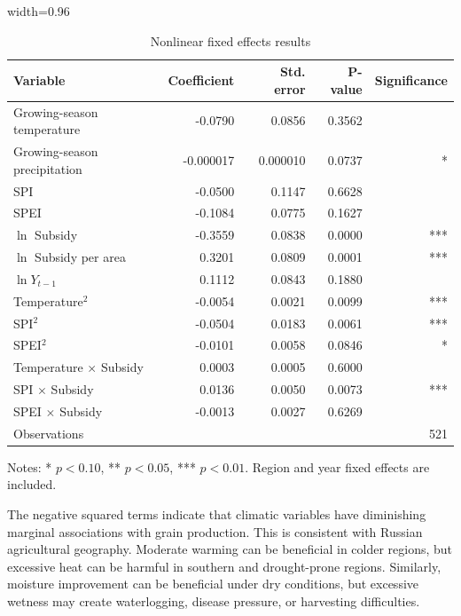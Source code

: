 \documentclass[12pt,a4paper]{article}
\begin{document}
\begin{table}[H]
\centering
\caption{Nonlinear fixed effects results}
\label{tab:nonlinear_fe}
\begin{threeparttable}
\begin{adjustbox}{width=0.96\textwidth}
\begin{tabular}{lrrrr}
\toprule
Variable & Coefficient & Std. error & P-value & Significance \\
\midrule
Growing-season temperature & -0.0790 & 0.0856 & 0.3562 &  \\
Growing-season precipitation & -0.000017 & 0.000010 & 0.0737 & * \\
SPI & -0.0500 & 0.1147 & 0.6628 &  \\
SPEI & -0.1084 & 0.0775 & 0.1627 &  \\
\(\ln\) Subsidy & -0.3559 & 0.0838 & 0.0000 & *** \\
\(\ln\) Subsidy per area & 0.3201 & 0.0809 & 0.0001 & *** \\
\(\ln Y_{t-1}\) & 0.1112 & 0.0843 & 0.1880 &  \\
Temperature\(^2\) & -0.0054 & 0.0021 & 0.0099 & *** \\
SPI\(^2\) & -0.0504 & 0.0183 & 0.0061 & *** \\
SPEI\(^2\) & -0.0101 & 0.0058 & 0.0846 & * \\
Temperature \(\times\) Subsidy & 0.0003 & 0.0005 & 0.6000 &  \\
SPI \(\times\) Subsidy & 0.0136 & 0.0050 & 0.0073 & *** \\
SPEI \(\times\) Subsidy & -0.0013 & 0.0027 & 0.6269 &  \\
\midrule
Observations & \multicolumn{4}{r}{521} \\
\bottomrule
\end{tabular}
\end{adjustbox}
\begin{tablenotes}
\small
\item Notes: * \(p<0.10\), ** \(p<0.05\), *** \(p<0.01\). Region and year fixed effects are included.
\end{tablenotes}
\end{threeparttable}
\end{table}

The negative squared terms indicate that climatic variables have diminishing marginal associations with grain production. This is consistent with Russian agricultural geography. Moderate warming can be beneficial in colder regions, but excessive heat can be harmful in southern and drought-prone regions. Similarly, moisture improvement can be beneficial under dry conditions, but excessive wetness may create waterlogging, disease pressure, or harvesting difficulties.
\end{document}
